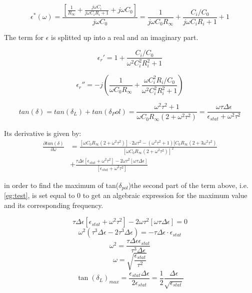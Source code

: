 \begin{equation}
\epsilon^*(\omega)= \frac{[\frac{1}{R_\infty}+\frac{j \omega C_i}{j\omega C_i R_i  +1}+j \omega C_0]}{j \omega C_0} = \frac{1}{j \omega C_0 R_\infty}+ \frac{C_i/C_0}{j\omega C_i R_i  +1}+1
\end{equation}

The term for $\epsilon$ is splitted up into a real and an imaginary part. 

\begin{equation}
\epsilon_r' = 1+ \frac{C_i/C_0}{\omega^2 C_i^2 R_i^2 +1}
\end{equation}

\begin{equation}
\epsilon_r'' = -j \left(\frac{1}{\omega C_0 R_\infty}+\frac{\omega C_i^2 R_i / C_0}{\omega^2 C_i^2 R_i^2 +1} \right)
\end{equation}

\begin{equation}
tan(\delta) = tan(\delta_L) + tan( \delta_Pol) = \frac{\omega^2 \tau^2+1}{\omega C_0 R_\infty (2+ \omega^2 \tau^2)}=\frac{\omega \tau \Delta \epsilon}{\epsilon_{stat} + \omega^2 \tau^2}
\end{equation}

Its derivative is given by: 
\begin{align}
\frac{\partial tan(\delta)}{ \partial \omega} & = \frac{[\omega C_0 R_\infty (2+\omega^2 \tau^2)]\cdot 2 \omega \tau^2 - (\omega^2 \tau^2 +1) [C_0 R_\infty (2+3 \omega^2 \tau^2)  }{[\omega C_0 R_\infty (2+\omega^2 \tau^2)]^2}\\
					      & + \frac{\tau \Delta \epsilon [\epsilon_{stat} + \omega^2 \tau^2] - 2 \omega \tau^2 [\omega \tau \Delta \epsilon]}{[\epsilon_{stat} +\omega^2 \tau^2]}
\label{eg:test}
					      \end{align}

in order to find the maximum of tan($\delta_{pol}$)the second part of the term above, i.e. \eqref{eg:test}, is set equal to 0 to get an algebraic expression
for the maximum value and its corresponding frequency.

\begin{equation}
\tau \Delta \epsilon [\epsilon_{stat} + \omega^2 \tau^2] -2\omega \tau^2 [\omega \tau \Delta \epsilon] = 0
\end{equation}
\begin{equation}
\omega^2 (\tau^3 \Delta \epsilon -2 \tau^3 \Delta \epsilon) = - \tau \Delta \epsilon \cdot \epsilon_{stat}
\end{equation}
\begin{equation}
\omega^2 = \frac{\tau \Delta \epsilon \epsilon_{stat}}{\tau^3 \Delta \epsilon}
\end{equation}
\begin{equation}
\omega = \sqrt{\frac{\epsilon_{stat}}{\tau^2}}
\end{equation}
\begin{equation}
\tan(\delta_L)_{max} = \frac{\epsilon_{stat} \Delta\epsilon}{2\epsilon_{stat}} = \frac{1}{2} \frac{\Delta \epsilon}{\sqrt{\epsilon_{stat}}}
\end{equation}


